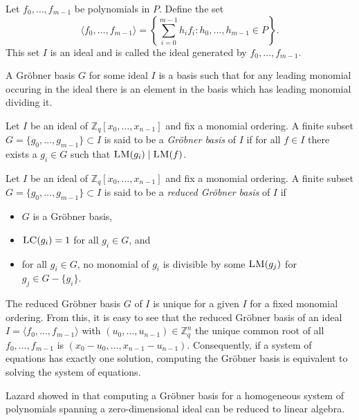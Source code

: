 \documentclass{llncs}
\newcommand{\ring}[1]{\mathbb{#1}}
\newcommand{\Z}{\ensuremath{\ring{Z}}\xspace}
\newcommand{\FX}{\ensuremath{\Z_q[x_0,\dots,x_{n-1}]}\xspace}
\newcommand{\sys}{\ensuremath{f_0,\dots,f_{m-1}}\xspace}
\newcommand{\ideal}[1]{\ensuremath{\langle #1 \rangle}\xspace}
\newcommand{\LM}{\ensuremath{\textsc{LM}}\xspace}
\newcommand{\LC}{\ensuremath{\textsc{LC}}\xspace}
\begin{document}
\begin{definition}
Let \sys be polynomials in $P$. Define the set
\[
\ideal{\sys} = \left\{ \sum_{i=0}^{m-1} h_i f_i : h_0 ,\dots , h_{m-1} \in P
\right\}.
\]
This set $I$ is an ideal and is called the ideal generated by $f_0, \dots, f_{m-1}$.
\end{definition}

A Gr\"{o}bner basis $G$ for some ideal $I$ is a basis such that for any leading monomial occuring in the ideal there is an element in the basis which has leading monomial dividing it.

\begin{definition}
Let $I$ be an ideal of $\FX$ and fix a monomial ordering. A finite subset $G = \{g_0 ,\dots , g_{m-1} \} \subset I$  is said to be a \emph{Gr\"{o}bner basis} of $I$ if for all $f \in I$ there exists a $g_i \in G$ such that $\LM(g_i) \mid \LM(f)$.
\end{definition}

\begin{definition}
Let $I$ be an ideal of $\FX$ and fix a monomial ordering. A finite subset $G = \{g_0 ,\dots , g_{m-1} \} \subset I$  is said to be a \emph{reduced Gr\"{o}bner basis} of $I$ if
\begin{itemize}
 \item $G$ is a Gr\"{o}bner basis,
 \item $\LC(g_i) = 1$ for all $g_i \in G$, and
 \item for all $g_i \in G$, no monomial of $g_i$ is divisible by some $\LM(g_j)$ for $g_j \in G - \{g_i\}$.
\end{itemize}
\end{definition}

The reduced Gr\"{o}bner basis $G$ of $I$ is unique for a given $I$ for a fixed monomial ordering. From this, it is easy to see that the reduced Gr\"{o}bner basis of an ideal $I = \ideal{\sys}$ with $(u_0,\dots,u_{n-1}) \in \Z_q^n$ the unique common root of all $\sys$ is $(x_0 - u_0,\dots,x_{n-1} - u_{n-1})$. Consequently, if a system of equations has exactly one solution, computing the Gr\"{o}bner basis is equivalent to solving the system of equations.

Lazard showed in \cite{lazard:eurocal83} that computing a Gr\"{o}bner basis for a homogeneous system of polynomials spanning a zero-dimensional ideal can be reduced to linear algebra.
\end{document}
